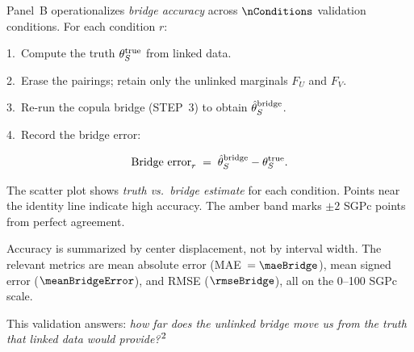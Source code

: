 \documentclass[10pt]{article}
\begin{document}
\noindent
\begin{minipage}[t]{3.75in}
  \vspace{0.05in}
  \hspace{0.15in}%
  \begin{minipage}{3.45in}
    \small\raggedright\color{bodyGrey}

    Panel~B operationalizes \emph{bridge accuracy} across $\nConditions$
    validation conditions. For each condition $r$:

    \vspace{2pt}
    \hspace{5pt}1.~Compute the truth $\theta_S^{\mathrm{true}}$ from linked data.

    \vspace{1pt}
    \hspace{5pt}2.~Erase the pairings; retain only the unlinked marginals
                  $F_U$ and $F_V$.

    \vspace{1pt}
    \hspace{5pt}3.~Re-run the copula bridge (STEP~3) to obtain
                  $\hat{\theta}_S^{\mathrm{bridge}}$.

    \vspace{1pt}
    \hspace{5pt}4.~Record the bridge error:

    \[
      \text{Bridge error}_r \;=\; \hat{\theta}_S^{\mathrm{bridge}} - \theta_S^{\mathrm{true}}.
    \]

    \vspace{4pt}
    The scatter plot shows \emph{truth vs.\ bridge estimate} for each
    condition. Points near the identity line indicate high accuracy.
    The amber band marks $\pm 2$ SGPc points from perfect agreement.

    \vspace{4pt}
    Accuracy is summarized by center displacement, not by interval width.
    The relevant metrics are mean absolute error (MAE~$= \maeBridge$),
    mean signed error ($\meanBridgeError$), and RMSE ($\rmseBridge$),
    all on the 0--100 SGPc scale.

    \vspace{4pt}
    This validation answers: \emph{how far does the unlinked bridge move us
    from the truth that linked data would provide?}$^{\mbox{\footnotesize{2}}}$

  \end{minipage}
  \vspace{0.1in}
\end{minipage}
\end{document}
